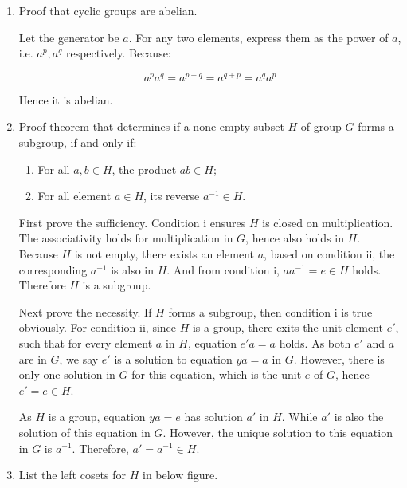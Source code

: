 \documentclass[UTF8]{article}
\begin{document}
\begin{enumerate}
\item {Proof that cyclic groups are abelian.}

Let the generator be $a$. For any two elements, express them as the power of $a$, i.e. $a^p, a^q$ respectively. Because:

\[
a^p a^q = a^{p + q} = a^{q + p} = a^q a^p
\]

Hence it is abelian.

\item {Proof theorem that determines if a none empty subset $H$ of group $G$ forms a subgroup, if and only if:
  \begin{enumerate}[i]
  \item For all $a, b \in H$, the product $ab \in H$;
  \item For all element $a \in H$, its reverse $a^{-1} \in H$.
  \end{enumerate}
}

First prove the sufficiency. Condition i ensures $H$ is closed on multiplication. The associativity holds for multiplication in $G$, hence also holds in $H$. Because $H$ is not empty, there exists an element $a$, based on condition ii, the corresponding $a^{-1}$ is also in $H$. And from condition i, $aa^{-1} = e \in H$ holds. Therefore $H$ is a subgroup.

Next prove the necessity. If $H$ forms a subgroup, then condition i is true obviously. For condition ii, since $H$ is a group, there exits the unit element $e'$, such that for every element $a$ in $H$, equation $e'a = a$ holds. As both $e'$ and $a$ are in $G$, we say $e'$ is a solution to equation $ya = a$ in $G$. However, there is only one solution in $G$ for this equation, which is the unit $e$ of $G$, hence $e' = e \in H$.

As $H$ is a group, equation $ya = e$ has solution $a'$ in $H$. While $a'$ is also the solution of this equation in $G$. However, the unique solution to this equation in $G$ is $a^{-1}$. Therefore, $a' = a^{-1} \in H$.

\item {List the left cosets for $H$ in below figure.}

\begin{figure*}[htbp]
\centering
{}
\end{figure*}


\end{enumerate}
\end{document}

